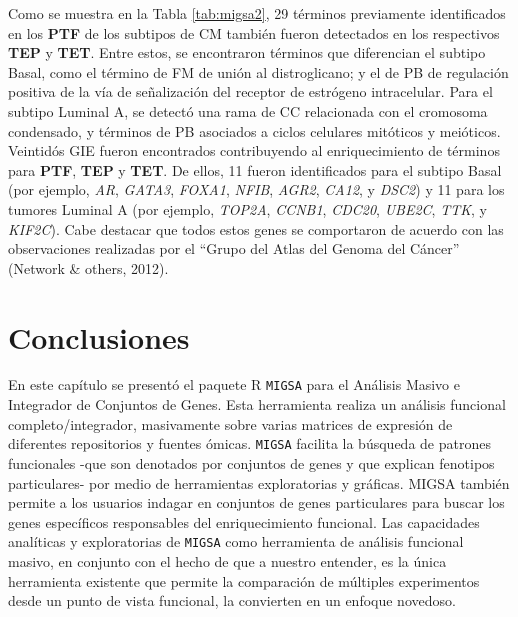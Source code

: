 \documentclass[12pt,twoside]{reedthesis}
\begin{document}
\par

Como se muestra en la Tabla \ref{tab:migsa2}, 29 términos previamente identificados en los \textbf{PTF} de los subtipos de CM también fueron detectados en los respectivos \textbf{TEP} y \textbf{TET}. Entre estos, se encontraron términos que diferencian el subtipo Basal, como el término de FM de unión al distroglicano; y el de PB de regulación positiva de la vía de señalización del receptor de estrógeno intracelular. Para el subtipo Luminal A, se detectó una rama de CC relacionada con el cromosoma condensado, y términos de PB asociados a ciclos celulares mitóticos y meióticos. Veintidós GIE fueron encontrados contribuyendo al enriquecimiento de términos para \textbf{PTF}, \textbf{TEP} y \textbf{TET}. De ellos, 11 fueron identificados para el subtipo Basal (por ejemplo, \emph{AR}, \emph{GATA3}, \emph{FOXA1}, \emph{NFIB}, \emph{AGR2}, \emph{CA12}, y \emph{DSC2}) y 11 para los tumores Luminal A (por ejemplo, \emph{TOP2A}, \emph{CCNB1}, \emph{CDC20}, \emph{UBE2C}, \emph{TTK}, y \emph{KIF2C}). Cabe destacar que todos estos genes se comportaron de acuerdo con las observaciones realizadas por el ``Grupo del Atlas del Genoma del Cáncer'' (Network \& others, 2012).

\hypertarget{conclusiones-1}{%
\section{Conclusiones}\label{conclusiones-1}}

\par

En este capítulo se presentó el paquete R \texttt{MIGSA} para el Análisis Masivo e Integrador de Conjuntos de Genes. Esta herramienta realiza un análisis funcional completo/integrador, masivamente sobre varias matrices de expresión de diferentes repositorios y fuentes ómicas. \texttt{MIGSA} facilita la búsqueda de patrones funcionales -que son denotados por conjuntos de genes y que explican fenotipos particulares- por medio de herramientas exploratorias y gráficas. MIGSA también permite a los usuarios indagar en conjuntos de genes particulares para buscar los genes específicos responsables del enriquecimiento funcional. Las capacidades analíticas y exploratorias de \texttt{MIGSA} como herramienta de análisis funcional masivo, en conjunto con el hecho de que a nuestro entender, es la única herramienta existente que permite la comparación de múltiples experimentos desde un punto de vista funcional, la convierten en un enfoque novedoso.
\end{document}
